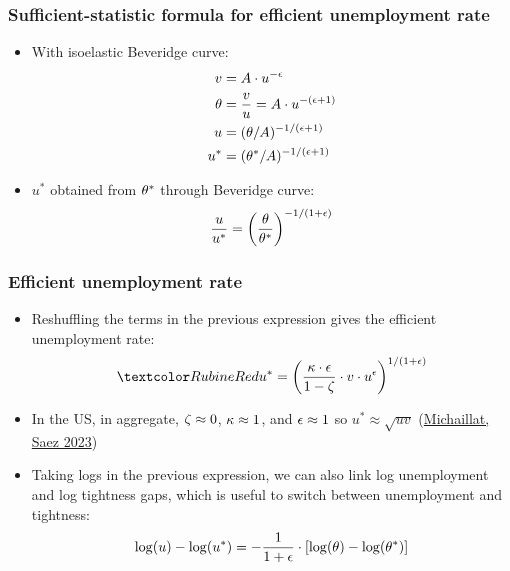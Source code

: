 \documentclass[11pt,aspectratio=169,xcolor={dvipsnames},hyperref={pdftex,pdfpagemode=UseNone,hidelinks,pdfdisplaydoctitle=true},usepdftitle=false]{beamer}
\begin{document}
\begin{frame}
\frametitle{Sufficient-statistic formula for efficient unemployment rate}
\begin{itemize}
\item With isoelastic Beveridge curve:
\begin{align*}
v &= A \cdot u^{-\epsilon} \\
\theta &= \frac{v}{u} = A \cdot u^{-(\epsilon+1)}\\
u &= (\theta/A)^{-1/(\epsilon+1)}\\
u^* &= (\theta^*/A)^{-1/(\epsilon+1)}
\end{align*}
\item $u^*$ obtained from $\theta^*$ through Beveridge curve:
\begin{equation*}
\frac{u}{u^*} = \left( \frac{\theta}{\theta^*} \right)^{-1/(1+\epsilon)}
\end{equation*}
\end{itemize}
\end{frame}

\begin{frame}
\frametitle{Efficient unemployment rate}
\begin{itemize}
\item Reshuffling the terms in the previous expression gives the efficient unemployment rate:
\begin{equation*}
\al{u^* = \bp{\frac{\k \cdot \e}{1-\z}\cdot v\cdot u^{\e}}^{1/(1+\e)}}
\end{equation*}
\item In the US, in aggregate, $\zeta \approx 0$, $\kappa\approx 1$, and $\epsilon\approx 1$ so $u^*\approx \sqrt{uv}$ (\href{https://pascalmichaillat.org/13/}{Michaillat, Saez 2023})
\item Taking logs in the previous expression, we can also link log unemployment and log tightness gaps, which is useful to switch between unemployment and tightness:
\begin{equation*}
\log(u) - \log(u^*) = -\frac{1}{1+\epsilon} \cdot [\log(\theta) - \log(\theta^*)]
\end{equation*}
\end{itemize}	
\end{frame}
\end{document}
